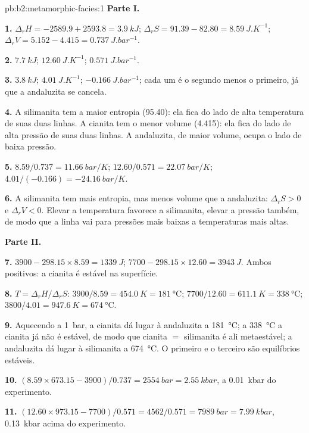 \begin{solution}{pb:b2:metamorphic-facies:1}
\noindent\textbf{Parte I.}

\textbf{1.} $\Delta_r H = -2589.9 + 2593.8 = \qty{3.9}{kJ}$; $\Delta_r S = 91.39 - 82.80 =
\qty{8.59}{J.K^{-1}}$; $\Delta_r V = 5.152 - 4.415 = \qty{0.737}{J.bar^{-1}}$.

\textbf{2.} $\qty{7.7}{kJ}$; $\qty{12.60}{J.K^{-1}}$; $\qty{0.571}{J.bar^{-1}}$.

\textbf{3.} $\qty{3.8}{kJ}$; $\qty{4.01}{J.K^{-1}}$; $\qty{-0.166}{J.bar^{-1}}$; cada um é
o segundo menos o primeiro, já que a andaluzita se cancela.

\textbf{4.} A silimanita tem a maior entropia (95.40): ela fica do lado de alta temperatura
de suas duas linhas. A cianita tem o menor volume (4.415): ela fica do lado de
alta pressão de suas duas linhas. A andaluzita, de maior volume, ocupa o
lado de baixa pressão.

\textbf{5.} $8.59/0.737 = \qty{11.66}{bar/K}$; $12.60/0.571 = \qty{22.07}{bar/K}$;
$4.01/(-0.166) = \qty{-24.16}{bar/K}$.

\textbf{6.} A silimanita tem mais entropia, mas menos volume que a andaluzita: $\Delta_r S > 0$
e $\Delta_r V < 0$. Elevar a temperatura favorece a silimanita, elevar a pressão
também, de modo que a linha vai para pressões mais baixas a temperaturas mais altas.

\noindent\textbf{Parte II.}

\textbf{7.} $3900 - 298.15\times8.59 = \qty{+1339}{J}$; $7700 - 298.15\times12.60 =
\qty{+3943}{J}$. Ambos positivos: a cianita é estável na superfície.

\textbf{8.} $T = \Delta_r H/\Delta_r S$: $3900/8.59 = \qty{454.0}{K} = \qty{181}{\celsius}$;
$7700/12.60 = \qty{611.1}{K} = \qty{338}{\celsius}$; $3800/4.01 = \qty{947.6}{K} =
\qty{674}{\celsius}$.

\textbf{9.} Aquecendo a \qty{1}{bar}, a cianita dá lugar à andaluzita a
\qty{181}{\celsius}; a \qty{338}{\celsius} a cianita já não é estável, de modo que cianita $=$
silimanita é ali metaestável; a andaluzita dá lugar à silimanita a
\qty{674}{\celsius}. O primeiro e o terceiro são equilíbrios estáveis.

\textbf{10.} $(8.59\times673.15 - 3900)/0.737 = \qty{2554}{bar} = \qty{2.55}{kbar}$,
a \qty{0.01}{kbar} do experimento.

\textbf{11.} $(12.60\times973.15 - 7700)/0.571 = 4562/0.571 = \qty{7989}{bar} =
\qty{7.99}{kbar}$, \qty{0.13}{kbar} acima do experimento.


\end{solution}
